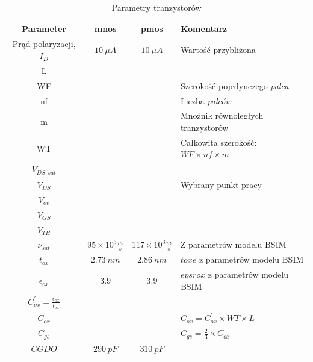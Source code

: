 \documentclass[twoside,pl,final]{labman}
\begin{document}
\begin{table}[htbp]
  \centering
  \caption{Parametry tranzystorów}
  \label{tab:devices}
  \begin{tabular}{ || c | c | c | p{} || }
    \hline \hline
    Parameter & nmos & pmos & Komentarz \\
    \hline
    Prąd polaryzacji, $I_D$ & $10~\mu{}A$ & $10~\mu{}A$ & Wartość przybliżona \\ \hline
    L                       &             &             &                                              \\ \hline
    WF                      &             &             & Szerokość pojedynczego \emph{palca}          \\ \hline
    nf                      &             &             & Liczba \emph{palców}                         \\ \hline
    m                       &             &             & Mnożnik równoległych tranzystorów  \\ \hline
    WT                      &             &             & Całkowita szerokość: $WF \times nf \times m$ \\ \hline
    $V_{DS,sat}$            &             &             & \\ \hline
    $V_{DS}$                &             &             & Wybrany punkt pracy \\ \hline
    $V_{ov}$                &             &             & \\ \hline
    $V_{GS}$                &             &             & \\ \hline
    $V_{TH}$                &             &             & \\ \hline
    $\nu_{sat}$             & $95 \times 10^3 \frac{m}{s}$ & $117 \times 10^3 \frac{m}{s}$ & Z parametrów modelu BSIM \\ \hline
    $t_{ox}$                & $2.73~nm$ & $2.86~nm$ & $toxe$ z parametrów modelu BSIM \\ \hline
    $\epsilon_{ox}$         & $3.9$ & $3.9$ & $epsrox$ z parametrów modelu BSIM \\ \hline
    $C_{ox}^\prime = \frac{\epsilon_{ox}}{t_{ox}}$ & & & \\ \hline
    $C_{ox}$                & & & $C_{ox} = C_{ox}^\prime \times WT \times L$ \\ \hline
    $C_{gs}$                & & & $C_{gs} = \frac{2}{3} \times C_{ox}$ \\ \hline
    $CGDO$                  & $290~pF$ & $310~pF$ & \\ \hline

\end{tabular}
\end{table}
\end{document}
